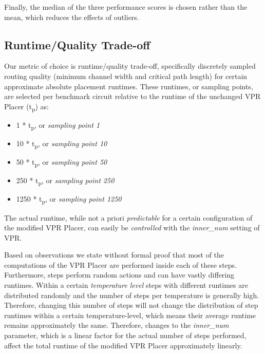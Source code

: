 Finally, the median of the three performance scores is chosen rather than the mean, which reduces the effects of outliers.

\pagebreak

\subsection{Runtime/Quality Trade-off}

Our metric of choice is runtime/quality trade-off, specifically discretely sampled routing quality (minimum channel width and critical path length) for certain approximate absolute placement runtimes. These runtimes, or sampling points, are selected per benchmark circuit relative to the runtime of the unchanged \gls{VPR} Placer (t\textsubscript{p}) as:

\begin{itemize}
	\item 1   * t\textsubscript{p}, or \textit{sampling point 1}
	\item 10  * t\textsubscript{p}, or \textit{sampling point 10}
	\item 50  * t\textsubscript{p}, or \textit{sampling point 50}
	\item 250 * t\textsubscript{p}, or \textit{sampling point 250}
	\item 1250 * t\textsubscript{p}, or \textit{sampling point 1250}
\end{itemize}

The actual runtime, while not a priori \textit{predictable} for a certain configuration of the modified \gls{VPR} Placer, can easily be \textit{controlled} with the \textit{inner\_num} setting of \gls{VPR}\cite{vtr8}. 

Based on observations we state without formal proof that most of the computations of the \gls{VPR} Placer are performed inside each of these steps. Furthermore, steps perform random actions and can have vastly differing runtimes. Within a certain \textit{temperature level} steps with different runtimes are distributed randomly and the number of steps per temperature is generally high. Therefore, changing this number of steps will not change the distribution of step runtimes within a certain temperature-level, which means their average runtime remains approximately the same. Therefore, changes to the \textit{inner\_num} parameter, which is a linear factor for the actual number of steps performed, affect the total runtime of the modified \gls{VPR} Placer approximately linearly.

